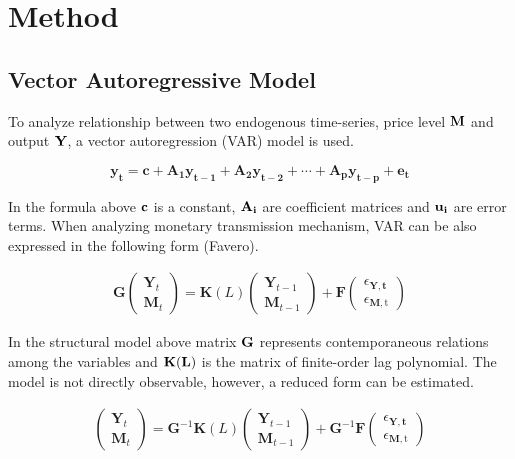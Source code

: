 \documentclass[a4paper,12pt]{article}
\begin{document}
\section{Method}
\subsection{Vector Autoregressive Model}

To analyze relationship between two endogenous time-series, price level \(\bf M\) and output \(\bf Y\), a vector autoregression (VAR) model is used.

\begin{equation}
		{\mathbf{y_{t}=c+A_{1}y_{{t-1}}+A_{2}y_{{t-2}}+\cdots +A_{p}y_{{t-p}}+e_{t}}}
\end{equation}

In the formula above \(\bf c\) is a constant, \(\bf A_i\) are coefficient matrices and \(\bf u_i\) are error terms. When analyzing monetary transmission mechanism, VAR can be also expressed in the following form (Favero).

\begin{equation}
\begin{split}
		\mathbf{G}\left(\begin{array}{c}
		\mathbf{Y}_{t} \\
		\mathbf{M}_{t}
		\end{array}\right)=\mathbf{K}(L)\left(\begin{array}{c}
		\mathbf{Y}_{t-1} \\
		\mathbf{M}_{t-1}
		\end{array}\right)+\mathbf{F}\left(\begin{array}{c}
		\epsilon_{\mathbf{Y}, \mathbf{t}} \\
		\epsilon_{\mathbf{M}, \mathrm{t}}
		\end{array}\right)
\end{split}
\end{equation}

In the structural model above matrix \(\bf G\) represents contemporaneous relations among the variables and \(\bf K(L)\) is the matrix of finite-order lag polynomial. The model is not directly observable, however, a reduced form can be estimated.

\begin{equation}
\begin{split}
		\left(\begin{array}{c}
		\mathbf{Y}_{t} \\
		\mathbf{M}_{t}
		\end{array}\right)=\mathbf{G}^{-1} \mathbf{K}(L)\left(\begin{array}{c}
		\mathbf{Y}_{t-1} \\
		\mathbf{M}_{t-1}
		\end{array}\right)+\mathbf{G}^{-1} \mathbf{F}\left(\begin{array}{c}
		\epsilon_{\mathbf{Y}, \mathbf{t}} \\
		\epsilon_{\mathbf{M}, \mathrm{t}}
		\end{array}\right)
\end{split}
\end{equation}
\end{document}
